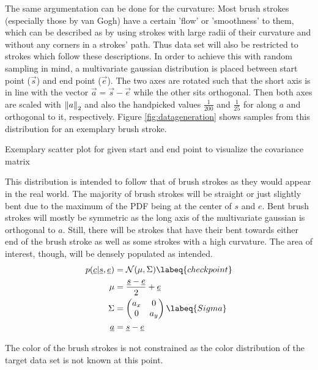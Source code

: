 The same argumentation can be done for the curvature:
Most brush strokes (especially those by van Gogh) have a certain 'flow' or 'smoothness'
to them, which can be described as by using strokes with large radii of their curvature
and without any corners in a strokes' path.
Thus data set will also be restricted to strokes which follow these descriptions.
In order to achieve this with random sampling in mind, a multivariate gaussian distribution
is placed between start point ($\vec{s}$) and end point ($\vec{e}$).
The two axes are rotated such that the short axis is in line with the vector
$\vec{a} = \vec{s} - \vec{e}$ while the other sits orthogonal.
Then both axes are scaled with $\left\lVert a\right\rVert_2$ and also the handpicked values $\frac{1}{200}$
and $\frac{1}{25}$ for along $a$ and orthogonal to it, respectively.
Figure \ref{fig:datageneration} shows samples from this distribution for an exemplary
brush stroke.
\begin{marginfigure}
    \resizebox{\textwidth}{!}{
        
    }
    \caption[]{Exemplary scatter plot for given start and end point to visualize the
    covariance matrix}
\end{marginfigure}
This distribution is intended to follow that of brush strokes as they would appear
in the real world.
The majority of brush strokes will be straight or just slightly bent due to the maximum
of the PDF being at the center of $s$ and $e$.
Bent brush strokes will mostly be symmetric as the long axis of the multivariate gaussian
is orthogonal to $a$.
Still, there will be strokes that have their bent towards either end of the brush stroke
as well as some strokes with a high curvature.
The area of interest, though, will be densely populated as intended.
\begin{align}
    p(\vec{c}| \vec{s}, \vec{e}) & = \mathcal{N}(\mu, \Sigma) \labeq{checkpoint} \\
    \mu & = \frac{\vec{s} - \vec{e}}{2} + \vec{e} \\
    \Sigma & =
        \begin{pmatrix}
            a_x & 0 \\
            0 & a_y
        \end{pmatrix} \labeq{Sigma}\\
    \vec{a} & = \vec{s} - \vec{e}
\end{align}

The color of the brush strokes is not constrained as the color distribution of the
target data set is not known at this point. 


